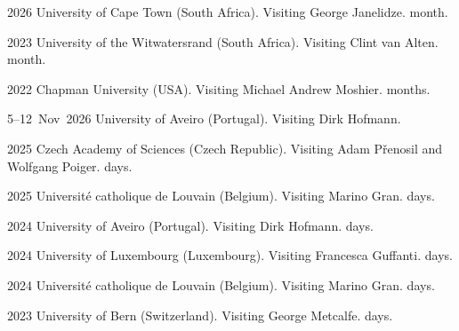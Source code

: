 

\chronorow
  {2026}
  {{University of Cape Town} (South Africa).}
  {Visiting George Janelidze.  month.}

\chronorow
  {2023}
  {{University of the Witwatersrand} (South Africa).}
  {Visiting Clint van Alten.  month.}

\chronorow
  {2022}
  {{Chapman University} (USA).}
  {Visiting Michael Andrew Moshier.  months.}


\chronorow
  {5--12~Nov~2026}
  {{University of Aveiro} (Portugal).}
  {Visiting Dirk Hofmann.}

\chronorow
  {2025}
  {{Czech Academy of Sciences} (Czech Republic).}
  {Visiting Adam Přenosil and Wolfgang Poiger.  days.}

\chronorow
  {2025}
  {{Université catholique de Louvain (Belgium)}.}
  {Visiting Marino Gran.  days.}

\chronorow
  {2024}
  {{University of Aveiro} (Portugal).}
  {Visiting Dirk Hofmann.  days.}

\chronorow
  {2024}
  {{University of Luxembourg} (Luxembourg).}
  {Visiting Francesca Guffanti.  days.}

\chronorow
  {2024}
  {Université catholique de Louvain (Belgium).}
  {Visiting Marino Gran.  days.}

\chronorow
  {2023}
  {{University of Bern} (Switzerland).}
  {Visiting George Metcalfe.  days.}

